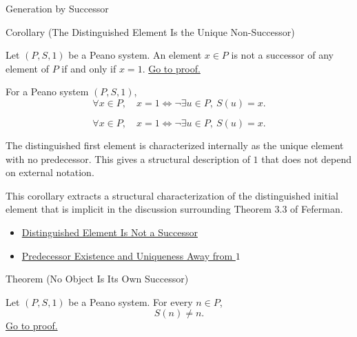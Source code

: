 \begin{topicbox}{Generation by Successor}
\begin{corollarybox}{Corollary (The Distinguished Element Is the Unique Non-Successor)}
\begin{corollary}
\label{cor:one-is-unique-non-successor}
Let $(P,S,1)$ be a Peano system. An element $x \in P$ is not a successor of
any element of $P$ if and only if $x=1$.
\hyperref[prf:one-is-unique-non-successor]{Go to proof.}
\end{corollary}
\end{corollarybox}

\begin{remark*}
For a Peano system $(P,S,1)$,
\[
\forall x \in P,\quad
x=1\Longleftrightarrow\neg\exists u \in P,\ S(u)=x.
\]
\end{remark*}

\begin{remark*}
\[
\forall x \in P,\quad
x=1\Longleftrightarrow\neg\exists u \in P,\ S(u)=x.
\]
\end{remark*}

\begin{remark*}[Interpretation]
The distinguished first element is characterized internally as the unique
element with no predecessor. This gives a structural description of $1$ that
does not depend on external notation.
\end{remark*}

\begin{remark*}
This corollary extracts a structural characterization of the distinguished
initial element that is implicit in the discussion surrounding Theorem 3.3 of
Feferman. \citet{FefermanNumberSystems1964}
\end{remark*}

\begin{dependencies}
\begin{itemize}
  \item \hyperref[ax:peano-base-not-successor]{Distinguished Element Is Not a Successor}
  \item \hyperref[cor:predecessor-exists-unique-away-from-one]{Predecessor Existence and Uniqueness Away from $1$}
\end{itemize}
\end{dependencies}

\begin{theorembox}{Theorem (No Object Is Its Own Successor)}
\begin{theorem}
\label{thm:no-object-is-its-own-successor}
Let $(P,S,1)$ be a Peano system. For every $n \in P$,
\[
S(n) \neq n.
\]
\hyperref[prf:no-object-is-its-own-successor]{Go to proof.}
\end{theorem}
\end{theorembox}


\end{topicbox}

